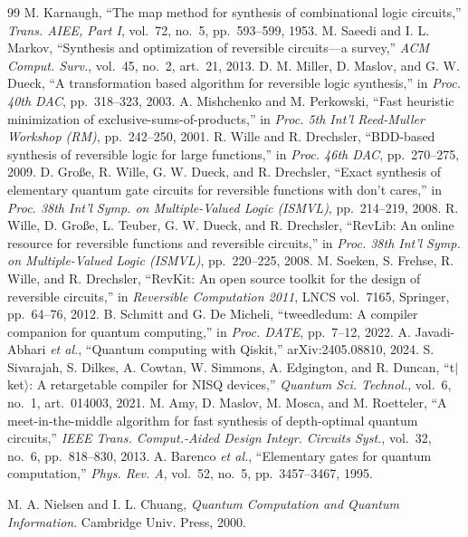 \documentclass[conference]{IEEEtran}
\theoremstyle{plain}
\begin{document}
\begin{thebibliography}{99}
 M. Karnaugh, ``The map method for synthesis of combinational logic circuits,'' \emph{Trans. AIEE, Part I}, vol.~72, no.~5, pp.~593--599, 1953.
 M. Saeedi and I. L. Markov, ``Synthesis and optimization of reversible circuits---a survey,'' \emph{ACM Comput. Surv.}, vol.~45, no.~2, art.~21, 2013.
 D. M. Miller, D. Maslov, and G. W. Dueck, ``A transformation based algorithm for reversible logic synthesis,'' in \emph{Proc. 40th DAC}, pp.~318--323, 2003.
 A. Mishchenko and M. Perkowski, ``Fast heuristic minimization of exclusive-sums-of-products,'' in \emph{Proc. 5th Int'l Reed-Muller Workshop (RM)}, pp.~242--250, 2001.
 R. Wille and R. Drechsler, ``BDD-based synthesis of reversible logic for large functions,'' in \emph{Proc. 46th DAC}, pp.~270--275, 2009.
 D. Gro{\ss}e, R. Wille, G. W. Dueck, and R. Drechsler, ``Exact synthesis of elementary quantum gate circuits for reversible functions with don't cares,'' in \emph{Proc. 38th Int'l Symp. on Multiple-Valued Logic (ISMVL)}, pp.~214--219, 2008.
 R. Wille, D. Gro{\ss}e, L. Teuber, G. W. Dueck, and R. Drechsler, ``RevLib: An online resource for reversible functions and reversible circuits,'' in \emph{Proc. 38th Int'l Symp. on Multiple-Valued Logic (ISMVL)}, pp.~220--225, 2008.
 M. Soeken, S. Frehse, R. Wille, and R. Drechsler, ``RevKit: An open source toolkit for the design of reversible circuits,'' in \emph{Reversible Computation 2011}, LNCS vol.~7165, Springer, pp.~64--76, 2012.
 B. Schmitt and G. De Micheli, ``tweedledum: A compiler companion for quantum computing,'' in \emph{Proc. DATE}, pp.~7--12, 2022.
 A. Javadi-Abhari \emph{et al.}, ``Quantum computing with Qiskit,'' arXiv:2405.08810, 2024.
 S. Sivarajah, S. Dilkes, A. Cowtan, W. Simmons, A. Edgington, and R. Duncan, ``t$|$ket$\rangle$: A retargetable compiler for NISQ devices,'' \emph{Quantum Sci. Technol.}, vol.~6, no.~1, art.~014003, 2021.
 M. Amy, D. Maslov, M. Mosca, and M. Roetteler, ``A meet-in-the-middle algorithm for fast synthesis of depth-optimal quantum circuits,'' \emph{IEEE Trans. Comput.-Aided Design Integr. Circuits Syst.}, vol.~32, no.~6, pp.~818--830, 2013.
 A. Barenco \emph{et al.}, ``Elementary gates for quantum computation,'' \emph{Phys. Rev. A}, vol.~52, no.~5, pp.~3457--3467, 1995.

 M. A. Nielsen and I. L. Chuang, \emph{Quantum Computation and Quantum Information}. Cambridge Univ. Press, 2000.
\end{thebibliography}
\end{document}
